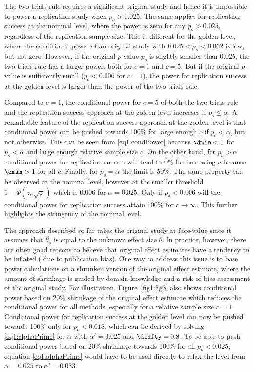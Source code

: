 The two-trials rule requires a significant original study and hence it is
impossible to power a replication study when $p_o > 0.025$. The same applies for
replication success at the nominal level, where the power is zero for any
$p_o > 0.025$, regardless of the replication sample size. This is different for
the golden level, where the conditional power of an original study with
$0.025 < p_o < 0.062$ is low, but not zero. However, if the original $p$-value
$p_o$ is slightly smaller than $0.025$, the two-trials rule has a larger power,
both for $c=1$ and $c=5$. But if the original $p$-value is sufficiently small
($p_o < 0.006$ for $c=1$), the power for replication success at the golden level
is larger than the power of the two-trials rule.


Compared to $c=1$, the conditional power for $c=5$ of both the two-trials rule
and the replication success approach at the golden level increases if
$p_o \leq \alpha$. A remarkable feature of the replication success approach at
the golden level is that conditional power can be pushed towards 100\% for large
enough $c$ if $p_o<\alpha$, but not otherwise. This can be seen from
\eqref{eq1:condPower} because $\dmin < 1$ for $p_o<\alpha$ and large enough
relative sample size $c$. On the other hand, for $p_o > \alpha$ conditional
power for replication success will tend to 0\% for increasing $c$ because
$\dmin>1$ for all $c$. Finally, for $p_o = \alpha$ the limit is 50\%. The same
property can be observed at the nominal level, however at the smaller threshold
$1-\Phi(z_\alpha \sqrt{\varphi})$ which is $0.006$ for $\alpha=0.025$. Only if
$p_o < 0.006$ will the conditional power for replication success attain 100\%
for $c \to \infty$. This further highlights the stringency of the nominal level.

The approach described so far takes the original study at face-value since it
assumes that $\hat \theta_o$ is equal to the unknown effect size $\theta$. In
practice, however, there are often good reasons to believe that original effect
estimates have a tendency to be inflated (\eg{} due to publication bias). One way
to address this issue is to base power calculations on a shrunken version of the
original effect estimate, where the amount of shrinkage is guided by domain
knowledge and a risk of bias assessment of the original study. For illustration,
Figure~\ref{fig1:fig3} also shows conditional power based on 20\% shrinkage of
the original effect estimate which reduces the conditional power for all
methods, especially for a relative sample size $c = 1$. Conditional power for
replication success at the golden level can now be pushed towards 100\% only for
$p_o < 0.018$, which can be derived by solving \eqref{eq1:alphaPrime} for
$\alpha$ with $\alpha'=0.025$ and $\dinfty=0.8$. To be able to push conditional
power based on 20\% shrinkage towards 100\% for all $p_o < 0.025$, equation
\eqref{eq1:alphaPrime} would have to be used directly to relax the level from
$\alpha=0.025$ to $\alpha'=0.033$.


